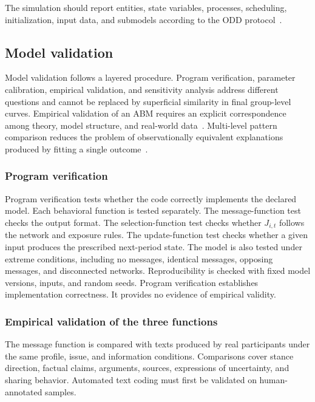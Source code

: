 \documentclass[11pt,a4paper]{article}
\begin{document}
The simulation should report entities, state variables, processes, scheduling, initialization, input data, and submodels according to the ODD protocol~\citep{grimm2020}.

\subsection{Model validation}

Model validation follows a layered procedure. Program verification, parameter calibration, empirical validation, and sensitivity analysis address different questions and cannot be replaced by superficial similarity in final group-level curves. Empirical validation of an ABM requires an explicit correspondence among theory, model structure, and real-world data~\citep{windrum2007}. Multi-level pattern comparison reduces the problem of observationally equivalent explanations produced by fitting a single outcome~\citep{grimm2005}.

\subsubsection{Program verification}

Program verification tests whether the code correctly implements the declared model. Each behavioral function is tested separately. The message-function test checks the output format. The selection-function test checks whether $J_{i,t}$ follows the network and exposure rules. The update-function test checks whether a given input produces the prescribed next-period state. The model is also tested under extreme conditions, including no messages, identical messages, opposing messages, and disconnected networks. Reproducibility is checked with fixed model versions, inputs, and random seeds. Program verification establishes implementation correctness. It provides no evidence of empirical validity.

\subsubsection{Empirical validation of the three functions}

The message function is compared with texts produced by real participants under the same profile, issue, and information conditions. Comparisons cover stance direction, factual claims, arguments, sources, expressions of uncertainty, and sharing behavior. Automated text coding must first be validated on human-annotated samples.
\end{document}
